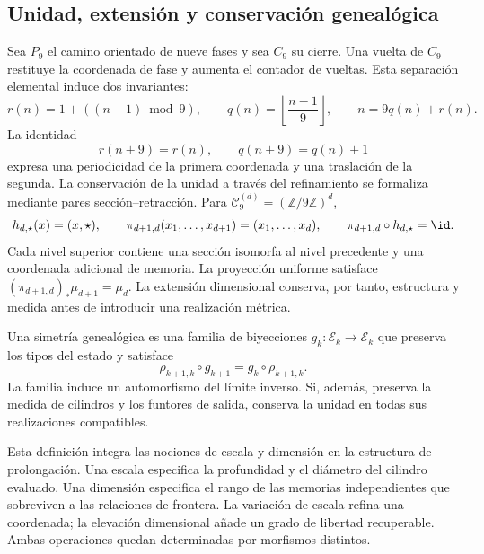 \subsection{Unidad, extensi\'on y conservaci\'on geneal\'ogica}

Sea \(P_9\) el camino orientado de nueve fases y sea \(C_9\) su cierre. Una
vuelta de \(C_9\) restituye la coordenada de fase y aumenta el contador de
vueltas. Esta separaci\'on elemental induce dos invariantes:
\begin{equation}
 r(n)=1+((n-1)\bmod9),
 \qquad
 q(n)=\left\lfloor\frac{n-1}{9}\right\rfloor,
 \qquad
 n=9q(n)+r(n).
 \label{eq:division-nonadica-inaugural}
\end{equation}
La identidad
\begin{equation}
 r(n+9)=r(n),
 \qquad q(n+9)=q(n)+1
 \label{eq:retorno-inaugural}
\end{equation}
expresa una periodicidad de la primera coordenada y una traslaci\'on de la
segunda. La conservaci\'on de la unidad a trav\'es del refinamiento se
formaliza mediante pares secci\'on--retracci\'on. Para
\(\mathcal C_9^{(d)}=(\mathbb Z/9\mathbb Z)^d\),
\begin{equation}
 h_{d,\star}(x)=(x,\star),
 \qquad
 \pi_{d+1,d}(x_1,\ldots,x_{d+1})=(x_1,\ldots,x_d),
 \qquad
 \pi_{d+1,d}\circ h_{d,\star}=\id.
 \label{eq:conservacion-dimensional-unidad}
\end{equation}
Cada nivel superior contiene una secci\'on isomorfa al nivel precedente y
una coordenada adicional de memoria. La proyecci\'on uniforme satisface
\((\pi_{d+1,d})_*\mu_{d+1}=\mu_d\). La extensi\'on dimensional conserva,
por tanto, estructura y medida antes de introducir una realizaci\'on
m\'etrica.

\begin{definition}
Una simetr\'ia geneal\'ogica es una familia de biyecciones
\(g_k:\mathcal E_k\to\mathcal E_k\) que preserva los tipos del estado y
satisface
\begin{equation}
 \rho_{k+1,k}\circ g_{k+1}=g_k\circ\rho_{k+1,k}.
 \label{eq:simetria-genealogica-formulacion}
\end{equation}
La familia induce un automorfismo del l\'imite inverso. Si, adem\'as,
preserva la medida de cilindros y los funtores de salida, conserva la unidad
en todas sus realizaciones compatibles.
\end{definition}

Esta definici\'on integra las nociones de escala y dimensi\'on en la
estructura de prolongaci\'on. Una escala especifica la profundidad y el
di\'ametro del cilindro evaluado. Una dimensi\'on especifica el rango de
las memorias independientes que sobreviven a las relaciones de frontera. La
variaci\'on de escala refina una coordenada; la elevaci\'on dimensional a\~nade
un grado de libertad recuperable. Ambas operaciones quedan determinadas por
morfismos distintos.

